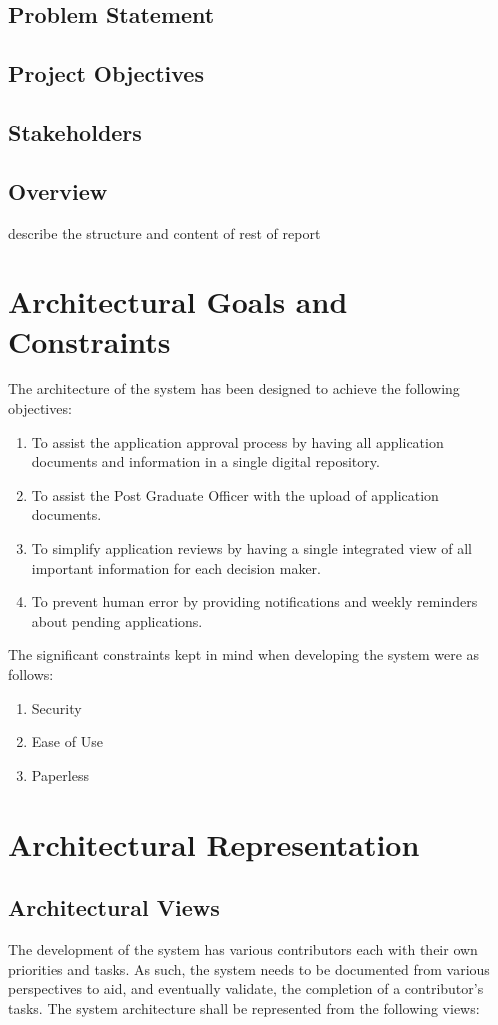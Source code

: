 \documentclass[11pt]{article}
\begin{document}
\subsection{Problem Statement}
\subsection{Project Objectives}
\subsection{Stakeholders}
\subsection{Overview}
describe the structure and content of rest of report
\section{Architectural Goals and Constraints}
The architecture of the system has been designed to achieve the following objectives:
\begin{enumerate}
	\item To assist the application approval process by having all application documents and information in a single digital repository.
	\item To assist the Post Graduate Officer with the upload of application documents.
	\item To simplify application reviews by having a single integrated view of all important information for each decision maker.
	\item To prevent human error by providing notifications and weekly reminders about pending applications.
	
\end{enumerate}

The significant constraints kept in mind when developing the system were as follows:

\begin{enumerate}
	\item Security
	\item Ease of Use
	\item Paperless
\end{enumerate}
\section{Architectural Representation}
\subsection{Architectural Views}
The development of the system has various contributors each with their own priorities and tasks. As such, the system needs to be documented from various perspectives to aid, and eventually validate, the completion of a contributor's tasks. The system architecture shall be represented from the following views:
\end{document}
